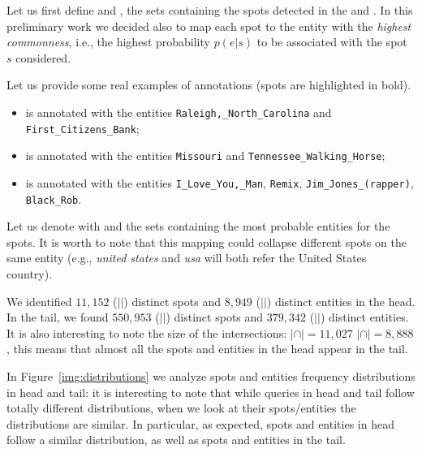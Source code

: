 Let us first define \shead{} and \stail{}, the sets containing the spots detected in the 
\head{} and \tail{}. In this preliminary work we decided also to map each spot 
to the entity with the \emph{highest commonness}, i.e., the highest probability $p(e|s)$
to be associated with the spot $s$ considered.

Let us provide some real examples of annotations (spots are highlighted in bold).
\begin{itemize}
\item {} is annotated with the entities 
\texttt{Raleigh,\_North\_Carolina} and \\ \texttt{First\_Citizens\_Bank};
\item {} is annotated with the entities  \texttt{Missouri} and  \texttt{Tennessee\_Walking\_Horse};
\item {} is annotated with the entities  \texttt{I\_Love\_You,\_Man}, \texttt{Remix}, \texttt{Jim\_Jones\_(rapper)}, \texttt{Black\_Rob}.
 \end{itemize}


Let us denote with \ehead{} and \etail{}
the sets containing the most probable entities for the spots. It is worth to note
that this mapping could collapse different spots on the same entity (e.g., \emph{united states} and 
\emph{usa} will both refer the United States country). 

We identified $11,152$ ($|$\shead{}$|$)  distinct spots and $8,949$ ($|$\ehead{}$|$) distinct 
entities in the head. In the tail, we found $550,953$ ($|$\stail{}$|$) distinct spots and 
$379,342$ ($|$\etail{}$|$) distinct entities. It  is also interesting to note the size of the 
intersections: \mbox{$|$\shead{}$\cap$\stail{}$|=11,027$}  $|$\ehead{}$\cap$\etail{}$| = 8,888$,
this means that almost all the spots and entities in the head appear in the tail. 

In Figure~\ref{img:distributions} we analyze spots and entities frequency distributions in head and tail:
it is interesting to note that while queries 
in head and tail follow totally different distributions, when we look at their 
spots/entities the distributions are similar. In particular, as expected, spots and entities 
in head follow a similar distribution, as well as spots and entities in the tail. 

